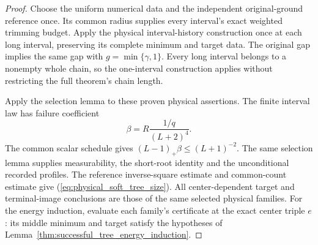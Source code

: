 \begin{proof}\leanok
    Choose the uniform numerical data and the independent original-ground
    reference once. Its common radius supplies every interval's exact
    weighted trimming budget. Apply the physical interval-history
    construction once at each long interval, preserving its complete
    minimum and target data. The original gap implies the same gap with
    $g=\min\{\gamma,1\}$. Every long interval belongs to a nonempty whole
    chain, so the one-interval construction applies without restricting
    the full theorem's chain length.

    Apply the selection lemma to these proven physical assertions.
    The finite interval law has failure coefficient
    \[
        \beta=R\frac{1/q}{(L+2)^4}.
    \]
    The common scalar schedule gives
    $(L-1)_+\beta\le(L+1)^{-2}$. The same selection lemma supplies
    measurability, the short-root identity and the unconditional recorded
    profiles. The reference inverse-square estimate and common-count
    estimate give (\ref{eq:physical_soft_tree_size}). All center-dependent
    target and terminal-image conclusions are those of the same selected
    physical families. For the energy induction, evaluate each family's
    certificate at the exact center triple $e$: its middle minimum and
    target satisfy the hypotheses of
    Lemma~\ref{thm:successful_tree_energy_induction}.
\end{proof}

